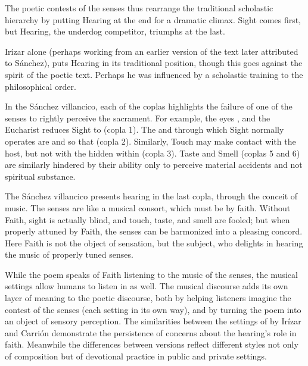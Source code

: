 The poetic contests of the senses thus rearrange the traditional scholastic
hierarchy by putting Hearing at the end for a dramatic climax.
Sight comes first, but Hearing, the underdog competitor, triumphs at the
last.
\begin{Footnote}
    Irízar alone (perhaps working from an earlier version of the text later
    attributed to Sánchez), puts Hearing in its traditional position, though
    this goes against the spirit of the poetic text.  
    Perhaps he was influenced by a scholastic training to  the
    philosophical order.
\end{Footnote}
In the Sánchez villancico, each of the coplas highlights the failure of one of
the senses to rightly perceive the sacrament.
For example, the eyes , and the Eucharist
reduces Sight to  (copla 1).
The  and  through which Sight normally
operates are   and
 so that  (copla 2).
Similarly, Touch may make contact with the host, but not with the
 hidden within (copla 3).
Taste and Smell (coplas 5 and 6) are similarly hindered by their ability only to
perceive material accidents and not spiritual substance.

The Sánchez villancico presents hearing in the last copla, through the conceit
of music.
The senses are  like a musical consort, which must be
 by faith.
Without Faith, sight is actually blind, and touch, taste, and smell are fooled;
but when properly attuned by Faith, the senses can be harmonized into a pleasing
concord.
Here Faith is not the object of sensation, but the subject, who delights in
hearing the music of properly tuned senses.

While the poem speaks of Faith listening to the music of the senses, the musical
settings allow humans to listen in as well.
The musical discourse adds its own layer of meaning to the poetic discourse,
both by helping listeners imagine the contest of the senses (each setting in its
own way), and by turning the poem into an object of sensory perception.
The similarities between the settings of  by Irízar and
Carrión demonstrate the persistence of concerns about the hearing's role in
faith.
Meanwhile the differences between versions reflect different styles not only of
composition but of devotional practice in public and private settings.

